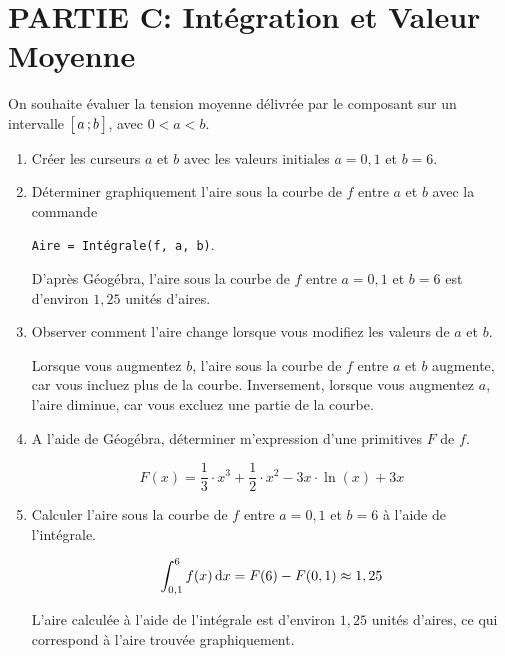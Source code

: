 \documentclass[11pt, a4paper]{report}
\begin{document}
\pagebreak
\thispagestyle{DS_LP}

\section*{PARTIE C: Intégration et Valeur Moyenne}

On souhaite évaluer la tension moyenne délivrée par le composant sur un intervalle $\bigl[ \, a \, ; b \,\bigl]$, avec $0<a<b$.

\begin{enumerate}[resume]
    \item Créer les curseurs $a$ et $b$ avec les valeurs initiales $a=0,1$ et $b=6$.  
    \item Déterminer graphiquement l'aire sous la courbe de $f$ entre $a$ et $b$ avec la commande 
    
    \verb|Aire = Intégrale(f, a, b)|.  
    \begin{blocvisible}[height=2]
        D'après Géogébra, l'aire sous la courbe de $f$ entre $a=0,1$ et $b=6$ est d'environ $1,25$ unités d'aires.
    \end{blocvisible}
        
    \item Observer comment l'aire change lorsque vous modifiez les valeurs de $a$ et $b$. 
    \begin{blocvisible}[height=3]
        Lorsque vous augmentez $b$, l'aire sous la courbe de $f$ entre $a$ et $b$ augmente, car vous incluez plus de la courbe. Inversement, lorsque vous augmentez $a$, l'aire diminue, car vous excluez une partie de la courbe.
    \end{blocvisible}

    \item A l'aide de Géogébra, déterminer m'expression d'une primitives $F$ de $f$. 
    \begin{blocvisible}[height=2]
        \[F(x) = \frac{1}{3}\cdot x^3 + \frac{1}{2} \cdot x^2 - 3x\cdot \ln(x) + 3x\]
    \end{blocvisible}

    \item Calculer l'aire sous la courbe de $f$ entre $a=0,1$ et $b=6$ à l'aide de l'intégrale. 
    \begin{blocvisible}[height=3]
        \[\int_{0,1}^6 f(x) \,\mathrm{d}x = F(6) - F(0,1) \approx 1,25\]

        L'aire calculée à l'aide de l'intégrale est d'environ $1,25$ unités d'aires, ce qui correspond à l'aire trouvée graphiquement.
    \end{blocvisible}


\end{enumerate}
\end{document}
